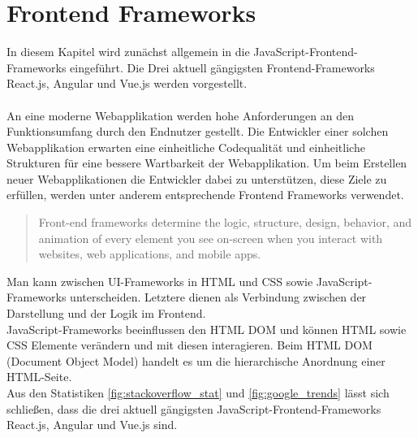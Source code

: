 %

\chapter{Frontend Frameworks}

In diesem Kapitel wird zunächst allgemein in die JavaScript-Frontend-Frameworks eingeführt.
Die Drei aktuell gängigsten Frontend-Frameworks React.js, Angular und Vue.js werden vorgestellt.
\\
\\
An eine moderne Webapplikation werden hohe Anforderungen an den Funktionsumfang durch den Endnutzer gestellt.
Die Entwickler einer solchen Webapplikation erwarten eine einheitliche Codequalität und einheitliche Strukturen
für eine bessere Wartbarkeit der Webapplikation.
Um beim Erstellen neuer Webapplikationen die Entwickler dabei zu unterstützen, diese Ziele zu erfüllen,
werden unter anderem entsprechende Frontend Frameworks verwendet.
\begin{quote}
    Front-end frameworks determine the logic, structure, design, behavior,
    and animation of every element you see on-screen when you interact with websites,
    web applications, and mobile apps. \cite{sigdestad22}
\end{quote}
Man kann zwischen UI-Frameworks in HTML und CSS sowie JavaScript-Frameworks unterscheiden.
Letztere dienen als Verbindung zwischen der Darstellung und der Logik im Frontend.
\\
JavaScript-Frameworks beeinflussen den HTML DOM und können HTML sowie CSS Elemente verändern und mit diesen interagieren.
Beim HTML DOM (Document Object Model) handelt es um die hierarchische Anordnung einer HTML-Seite. \cite[S. 26-27]{steyer2019}%
\\
Aus den Statistiken \ref{fig:stackoverflow_stat} und \ref{fig:google_trends} lässt sich schließen,
dass die drei aktuell gängigsten JavaScript-Frontend-Frameworks React.js, Angular und Vue.js sind.

